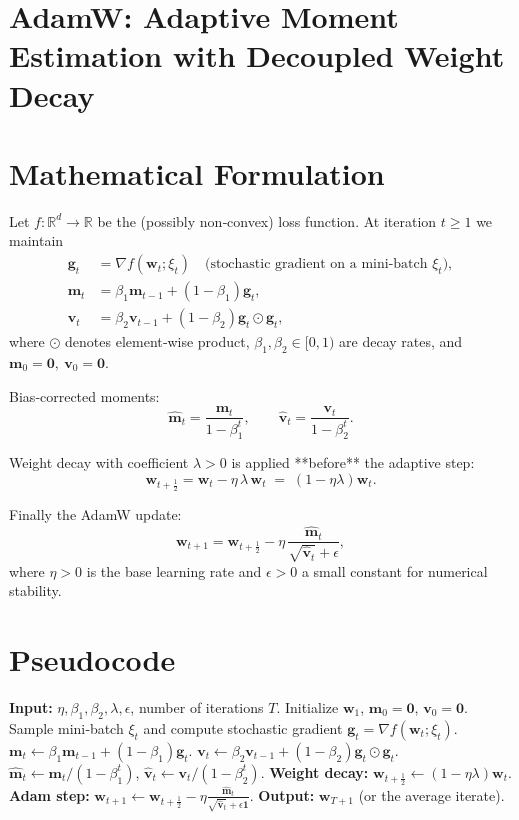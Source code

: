 \documentclass[11pt]{article}
\newcommand{\RR}{\mathbb{R}}
\begin{document}
\section*{AdamW: Adaptive Moment Estimation with Decoupled Weight Decay}

\section*{Mathematical Formulation}
Let $f:\RR^{d}\rightarrow\RR$ be the (possibly non‑convex) loss function.  
At iteration $t\ge 1$ we maintain
\[
\begin{aligned}
\bm{g}_t &= \nabla f(\bm{w}_t; \xi_t) \quad\text{(stochastic gradient on a mini‑batch $\xi_t$)},\\[4pt]
\bm{m}_t &= \beta_1 \bm{m}_{t-1} + (1-\beta_1)\bm{g}_t,\\[4pt]
\bm{v}_t &= \beta_2 \bm{v}_{t-1} + (1-\beta_2)\bm{g}_t\odot\bm{g}_t,
\end{aligned}
\]
where $\odot$ denotes element‑wise product, $\beta_1,\beta_2\in[0,1)$ are decay rates,
and $\bm{m}_0=\bm{0},\ \bm{v}_0=\bm{0}$.

Bias‑corrected moments:
\[
\hat{\bm{m}}_t = \frac{\bm{m}_t}{1-\beta_1^{t}},\qquad
\hat{\bm{v}}_t = \frac{\bm{v}_t}{1-\beta_2^{t}} .
\]

Weight decay with coefficient $\lambda>0$ is applied **before** the adaptive step:
\[
\bm{w}_{t+\frac12}= \bm{w}_t - \eta\,\lambda\,\bm{w}_t \;=\;(1-\eta\lambda)\bm{w}_t .
\]

Finally the AdamW update:
\[
\bm{w}_{t+1}= \bm{w}_{t+\frac12}
               -\eta\,
               \frac{\hat{\bm{m}}_t}{\sqrt{\hat{\bm{v}}_t}+\epsilon},
\]
where $\eta>0$ is the base learning rate and $\epsilon>0$ a small constant for numerical stability.

\section*{Pseudocode}
\begin{algorithm}[H]
\caption{AdamW}
\begin{algorithmic}[1]
\STATE \textbf{Input:} $\eta,\beta_1,\beta_2,\lambda,\epsilon$, number of iterations $T$.
\STATE Initialize $\bm{w}_1$, $\bm{m}_0=\bm{0}$, $\bm{v}_0=\bm{0}$.
    \STATE Sample mini‑batch $\xi_t$ and compute stochastic gradient $\bm{g}_t=\nabla f(\bm{w}_t;\xi_t)$.
    \STATE $\bm{m}_t \leftarrow \beta_1\bm{m}_{t-1}+(1-\beta_1)\bm{g}_t$.
    \STATE $\bm{v}_t \leftarrow \beta_2\bm{v}_{t-1}+(1-\beta_2)\bm{g}_t\odot\bm{g}_t$.
    \STATE $\hat{\bm{m}}_t \leftarrow \bm{m}_t/(1-\beta_1^{t})$,
          $\hat{\bm{v}}_t \leftarrow \bm{v}_t/(1-\beta_2^{t})$.
    \STATE \textbf{Weight decay:} $\bm{w}_{t+\frac12}\leftarrow (1-\eta\lambda)\bm{w}_t$.
    \STATE \textbf{Adam step:}
          $\displaystyle \bm{w}_{t+1}\leftarrow \bm{w}_{t+\frac12}
                -\eta\frac{\hat{\bm{m}}_t}{\sqrt{\hat{\bm{v}}_t}+\epsilon\bm{1}}$.
\ENDFOR
\STATE \textbf{Output:} $\bm{w}_{T+1}$ (or the average iterate).
\end{algorithmic}
\end{algorithm}
\end{document}
